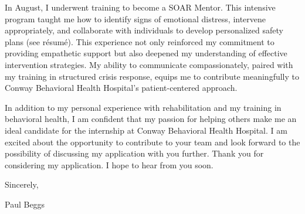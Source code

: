 \documentclass[11pt,letterpaper]{article}
\begin{document}
In August, I underwent training to become a SOAR Mentor. This intensive program taught me how to identify signs of emotional distress, intervene appropriately, and collaborate with individuals to develop personalized safety plans (see r\'esum\'e). This experience not only reinforced my commitment to providing empathetic support but also deepened my understanding of effective intervention strategies. My ability to communicate compassionately, paired with my training in structured crisis response, equips me to contribute meaningfully to Conway Behavioral Health Hospital's patient-centered approach.




In addition to my personal experience with rehabilitation and my training in behavioral health, I am confident that my passion for helping others make me an ideal candidate for the internship at Conway Behavioral Health Hospital. I am excited about the opportunity to contribute to your team and look forward to the possibility of discussing my application with you further. Thank you for considering my application. I hope to hear from you soon.


Sincerely, \\

\vspace*{1cm}

Paul Beggs
\end{document}
